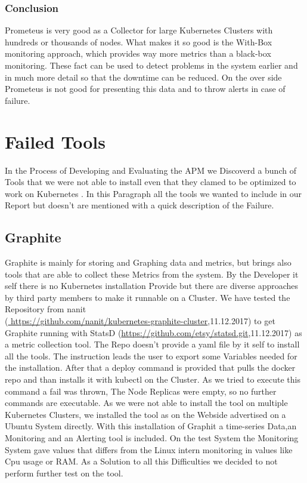 \subsubsection{Conclusion}
Prometeus is very good as a Collector for large Kubernetes Clusters with hundreds or thousands of nodes. What makes it so good is the With-Box monitoring approach, which provides way more metrics than a black-box monitoring. These fact can be used to detect problems in the system earlier and in much more detail so that the downtime can be reduced. On the over side Prometeus is not good for presenting this data and to throw alerts in case of failure.


\section{Failed Tools}%
In the Process of Developing and Evaluating the APM we Discoverd a bunch of Tools that we were not able to install even that they clamed to be optimized to work on Kubernetes .
In this Paragraph all the tools we wanted to include in our Report but doesn't are mentioned with a quick description of the Failure.
\subsection{Graphite}
Graphite is mainly for storing and Graphing data and metrics, but brings also tools that are able to collect these Metrics from the system. By the Developer it self there is no Kubernetes installation Provide but there are diverse approaches by third party members to make it runnable on a Cluster. We have tested the Repository from nanit\\(\url{ https://github.com/nanit/kubernetes-graphite-cluster},11.12.2017) to get Graphite running with StatsD (\url{https://github.com/etsy/statsd.git},11.12.2017) as a metric collection tool. The Repo doesn't provide a yaml file by it self to install all the tools. The instruction leads the user to export some Variables needed for the installation. After that a deploy command is provided that pulls the docker repo and than installs it with kubectl on the Cluster. As we tried to execute this command a fail was thrown, The Node Replicas were empty, so no further commands are executable. As we were not able to install the tool on multiple Kubernetes Clusters, we installed the tool as on the Webside advertised on a Ubuntu System directly. With this installation of Graphit a time-series Data,an Monitoring and an Alerting tool is included. On the test System the Monitoring System gave values that differs from the Linux intern monitoring in values like Cpu usage or RAM. As a Solution to all this Difficulties we decided to not perform further test on the tool.

